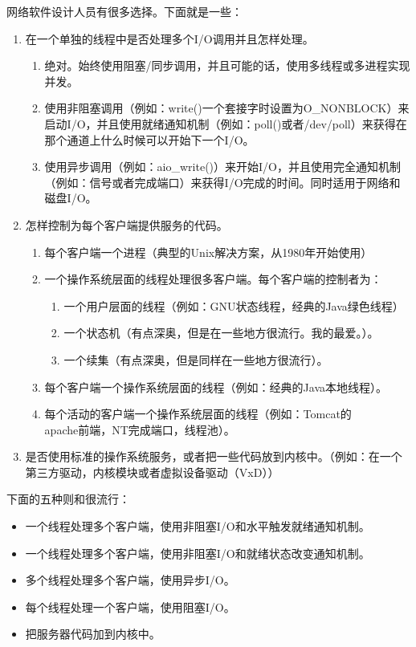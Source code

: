 \documentclass[twoside, xetex]{report}
\begin{document}
网络软件设计人员有很多选择。下面就是一些：
	\begin{enumerate}
	
		\item 在一个单独的线程中是否处理多个I/O调用并且怎样处理。
		
			\begin{enumerate}
				\item 绝对。始终使用阻塞/同步调用，并且可能的话，使用多线程或多进程实现并发。
				\item 使用非阻塞调用（例如：write()一个套接字时设置为O\_NONBLOCK）来启动I/O，并且使用就绪通知机制（例如：poll()或者/dev/poll）来获得在那个通道上什么时候可以开始下一个I/O。
				\item 使用异步调用（例如：aio\_write()）来开始I/O，并且使用完全通知机制（例如：信号或者完成端口）来获得I/O完成的时间。同时适用于网络和磁盘I/O。
			\end{enumerate}
		\item 怎样控制为每个客户端提供服务的代码。
			\begin{enumerate}
				\item 每个客户端一个进程（典型的Unix解决方案，从1980年开始使用）
				\item 一个操作系统层面的线程处理很多客户端。每个客户端的控制者为：
				\begin{enumerate}
					\item  一个用户层面的线程（例如：GNU状态线程，经典的Java绿色线程）
					\item  一个状态机（有点深奥，但是在一些地方很流行。我的最爱。）。
					\item  一个续集（有点深奥，但是同样在一些地方很流行）。
				\end{enumerate}
				\item 每个客户端一个操作系统层面的线程（例如：经典的Java本地线程）。
				\item 每个活动的客户端一个操作系统层面的线程（例如：Tomcat的\\apache前端，NT完成端口，线程池）。
			\end{enumerate}
		\item 是否使用标准的操作系统服务，或者把一些代码放到内核中。（例如：在一个第三方驱动，内核模块或者虚拟设备驱动（VxD））
	\end{enumerate}
	
	
下面的五种则和很流行：
	\begin{itemize}
		\item 一个线程处理多个客户端，使用非阻塞I/O和水平触发就绪通知机制。
		\item 一个线程处理多个客户端，使用非阻塞I/O和就绪状态改变通知机制。
		\item 多个线程处理多个客户端，使用异步I/O。
		\item 每个线程处理一个客户端，使用阻塞I/O。
		\item 把服务器代码加到内核中。
	\end{itemize}
	
\end{document}
